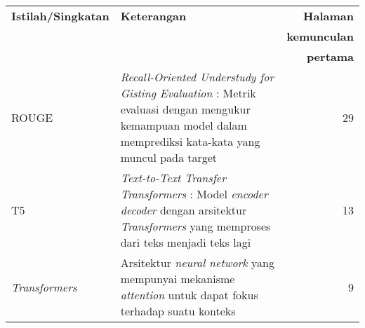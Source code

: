 \clearpage
\begin{center}
   \begin{table}[t!]
        \renewcommand{\arraystretch}{1.5}
        \begin{tabularx}{\textwidth}{lXr}
            \textbf{Istilah/Singkatan} & \textbf{Keterangan} & \textbf{Halaman} \\
                                       & & \textbf{kemunculan} \\
                                       & & \textbf{pertama} \\
            ROUGE & \textit{Recall-Oriented Understudy for Gisting Evaluation} : Metrik evaluasi dengan mengukur kemampuan model dalam memprediksi kata-kata yang muncul pada target & 29 \\
            T5 & \textit{Text-to-Text Transfer Transformers} : Model \textit{encoder decoder} dengan arsitektur \textit{Transformers} yang memproses dari teks menjadi teks lagi & 13 \\
            \textit{Transformers} & Arsitektur \textit{neural network} yang mempunyai mekanisme \textit{attention} untuk dapat fokus terhadap suatu konteks & 9 \\
        \end{tabularx}
    \end{table}
\end{center}
